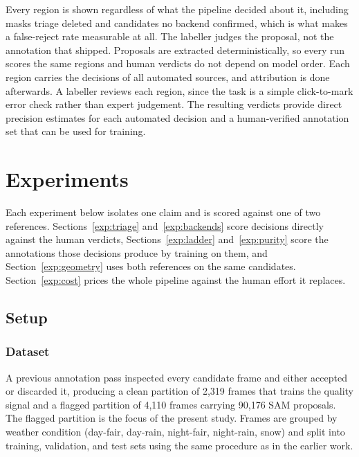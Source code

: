 \documentclass[journal]{IEEEtran}
\begin{document}
Every region is shown regardless of what the pipeline decided about it, including masks triage deleted and candidates no backend confirmed, which is what makes a false-reject rate measurable at all.
The labeller judges the proposal, not the annotation that shipped.
Proposals are extracted deterministically, so every run scores the same regions and human verdicts do not depend on model order. 
Each region carries the decisions of all automated sources, and attribution is done afterwards. 
A labeller reviews each region, since the task is a simple click-to-mark error check rather than expert judgement.
The resulting verdicts provide direct precision estimates for each automated decision and a human‑verified annotation set that can be used for training.




\section{Experiments}
\label{sec:experiments}

Each experiment below isolates one claim and is scored against one of two references.
Sections~\ref{exp:triage} and~\ref{exp:backends} score decisions directly against the human verdicts, Sections~\ref{exp:ladder} and~\ref{exp:purity} score the annotations those decisions produce by training on them, and Section~\ref{exp:geometry} uses both references on the same candidates.
Section~\ref{exp:cost} prices the whole pipeline against the human effort it replaces.




\subsection{Setup}

\subsubsection{Dataset}
A previous annotation pass \cite{tahves2026samenhancedsegmentationroaddatasets} inspected every candidate frame and either accepted or discarded it, producing a clean partition of 2{,}319 frames that trains the quality signal and a flagged partition of 4{,}110 frames carrying 90{,}176 SAM proposals.
The flagged partition is the focus of the present study.
Frames are grouped by weather condition (day-fair, day-rain, night-fair, night-rain, snow) and split into training, validation, and test sets using the same procedure as in the earlier work.
\end{document}
